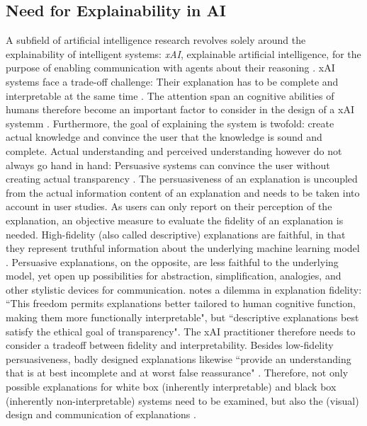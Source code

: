\subsection{Need for Explainability in AI}
A subfield of artificial intelligence research revolves solely around the explainability of intelligent systems: \textit{xAI}, explainable artificial intelligence, for the purpose of enabling communication with agents about their reasoning \cite{hendricks2018generating}. xAI systems face a trade-off challenge: Their explanation has to be complete and interpretable at the same time \cite{gilpin2018explaining}. The attention span an cognitive abilities of humans therefore become an important factor to consider in the design of a xAI systemm \cite{kulesza2013too}. Furthermore, the goal of explaining the system is twofold: create actual knowledge and convince the user that the knowledge is sound and complete. Actual understanding and perceived understanding however do not always go hand in hand: Persuasive systems can convince the user without creating actual transparency \cite{gilpin2018explaining}. The persuasiveness of an explanation is uncoupled from the actual information content of an explanation \cite{biran2017explanation} and needs to be taken into account in user studies. As users can only report on their perception of the explanation, an objective measure to evaluate the fidelity of an explanation is needed. High-fidelity (also called descriptive) explanations are faithful, in that they represent truthful information about the underlying machine learning model \cite{herman2017promise}. Persuasive explanations, on the opposite, are less faithful to the underlying model, yet open up possibilities for abstraction, simplification, analogies, and other stylistic devices for communication. \cite{herman2017promise} notes a dilemma in explanation fidelity: ``This freedom permits explanations better tailored to human cognitive function, making them more functionally interpretable", but ``descriptive explanations best satisfy the ethical goal of transparency". The xAI practitioner therefore needs to consider a tradeoff between fidelity and interpretability. \newline 
Besides low-fidelity persuasiveness, badly designed explanations likewise ``provide an understanding that is at best incomplete and at worst false reassurance" \cite{burrell2016machine}. Therefore, not only possible explanations for white box (inherently interpretable) and black box (inherently non-interpretable) systems need to be examined, but also the (visual) design and communication of explanations \cite{guidotti2018survey}. \newline
